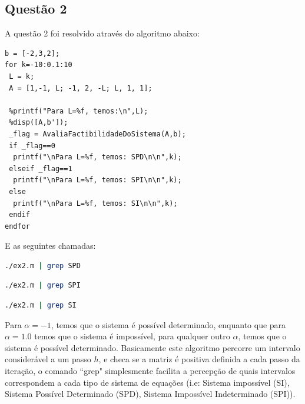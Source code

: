\documentclass[a4paper, 11pt]{article}
\begin{document}
\subsection*{Questão 2}
A questão 2 foi resolvido através do algoritmo abaixo:


\begin{lstlisting}
b = [-2,3,2]; 
for k=-10:0.1:10
 L = k;
 A = [1,-1, L; -1, 2, -L; L, 1, 1];
 
 %printf("Para L=%f, temos:\n",L);
 %disp([A,b']);
 _flag = AvaliaFactibilidadeDoSistema(A,b);
 if _flag==0
  printf("\nPara L=%f, temos: SPD\n\n",k);
 elseif _flag==1
  printf("\nPara L=%f, temos: SPI\n\n",k);
 else
  printf("\nPara L=%f, temos: SI\n\n",k);
 endif
endfor
\end{lstlisting}

E as seguintes chamadas:

\begin{lstlisting}[language=bash]
./ex2.m | grep SPD
\end{lstlisting}

\begin{lstlisting}[language=bash]
./ex2.m | grep SPI
\end{lstlisting}

\begin{lstlisting}[language=bash]
./ex2.m | grep SI
\end{lstlisting}

Para $\alpha=-1$, temos que o sistema é possível determinado, enquanto que para $\alpha=1.0$ temos que o sistema é impossível, para qualquer outro $\alpha$, temos que o 
sistema é possível determinado.\newline
Basicamente este algoritmo percorre um intervalo considerável a um passo $h$, e checa se a matriz é positiva definida a cada passo da iteração, o comando ``grep" simplesmente facilita a
percepção de quais intervalos correspondem a cada tipo de sistema de equações (i.e: Sistema impossível (SI), Sistema Possível Determinado (SPD), Sistema Impossível Indeterminado (SPI)).
\end{document}
